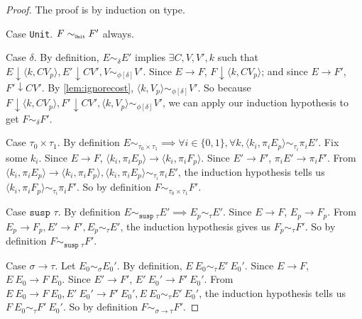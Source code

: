 \begin{proof}
  The proof is by induction on type.

  Case \texttt{Unit}.
  $F \sim_{\texttt{\tiny{Unit}}} F'$ always.

  Case $\delta$.
  By definition, $E \sim_\delta E'$ implies $\exists C, V, V', k$ such that $E \downarrow \langle k, C V_p \rangle, E' \downarrow C V', V \sim_{\phi[\delta]} V'$.
  Since $E \to F$, $F \downarrow \langle k, C V_p \rangle$; and since $E \to F'$, $F' \downarrow C V'$.
  By \ref{lem:ignorecost}, $\langle k, V_p \rangle \sim_{\phi[\delta]} V'$.
  So because $F \downarrow \langle k, C V_p \rangle, F' \downarrow C V', \langle k, V_p \rangle \sim_{\phi[\delta]} V'$, we can apply our induction hypothesis to get $F \sim_\delta F'$.

  Case $\tau_0 \times \tau_1$.
  By definition $E \sim_{\tau_0 \times \tau_1} \implies \forall i \in \{0, 1\}, \forall k, \langle k_i, \pi_i E_p \rangle \sim_{\tau_i} \pi_i E'$.
  Fix some $k_i$.
  Since $E \to F$, $\langle k_i, \pi_i E_p \rangle \to \langle k_i, \pi_i F_p \rangle$.
  Since $E' \to F'$, $\pi_i E' \to \pi_i F'$.
  From $\langle k_i, \pi_i E_p \rangle \to \langle k_i, \pi_i F_p \rangle, \langle k_i, \pi_i E_p \rangle \sim_{\tau_i} \pi_i E'$, the induction hypothesis tells us $\langle k_i, \pi_i F_p \rangle \sim_{\tau_i} \pi_i F'$.
  So by definition $F \sim_{\tau_0 \times \tau_1} F'$.

  Case $\texttt{susp } \tau$.
  By definition $E \sim_{\texttt{susp }\tau} E' \implies E_p \sim_\tau E'$.
  Since $E \to F$, $E_p \to F_p$.
  From $E_p \to F_p, E' \to F', E_p \sim_\tau E'$, the induction hypothesis gives us $F_p \sim_\tau F'$.
  So by definition $F \sim_{\texttt{susp }\tau} F'$.

  Case $\sigma \to \tau$.
  Let $E_0 \sim_\sigma E_0'$.
  By definition, $E\ E_0 \sim_\tau E'\ E_0'$.
  Since $E \to F$, $E\ E_0 \to F\ E_0$.
  Since $E' \to F'$, $E'\ E_0' \to F'\ E_0'$.
  From $E\ E_0 \to F\ E_0, E'\ E_0' \to F'\ E_0', E\ E_0 \sim_\tau E'\ E_0'$, the induction hypothesis tells us $F\ E_0 \sim_\tau F'\ E_0'$.
  So by definition $F \sim_{\sigma \to \tau} F'$.
\end{proof}

